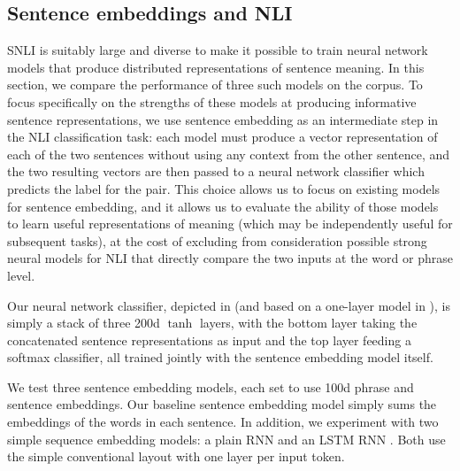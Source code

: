
\subsection{Sentence embeddings and NLI}\label{sentence-embedding}

SNLI is suitably large and diverse to make it possible to train neural network models that produce distributed representations of sentence meaning. In this section, we compare the performance of three such models on the corpus. To focus specifically on the strengths of these models at producing informative sentence representations, we use sentence embedding as an intermediate step in the NLI classification task: each model must produce a vector representation of each of the two sentences without using any context from the other sentence, and the two resulting vectors are then passed to a neural network classifier which predicts the label for the pair. This choice allows us to focus on existing models for sentence embedding, and it allows us to evaluate the ability of those models to learn useful representations of meaning (which may be independently useful for subsequent tasks), at the cost of excluding from consideration possible strong neural models for NLI that directly compare the two inputs at the word or phrase level.



Our neural network classifier, depicted in  (and based on a one-layer model in \citealt{Bowman:Potts:Manning:2014}), is simply a stack of three 200d $\tanh$ layers, with the bottom layer taking the concatenated sentence representations as input and the top layer feeding a softmax classifier, all trained jointly with the sentence embedding model itself.

We test three sentence embedding models, each set to use 100d phrase and sentence embeddings. Our baseline sentence embedding model simply sums the embeddings of the words in each sentence. In addition, we experiment with two simple sequence embedding models: a plain RNN and an LSTM RNN \cite{hochreiter1997long}. Both use the simple conventional layout with one layer per input token.

